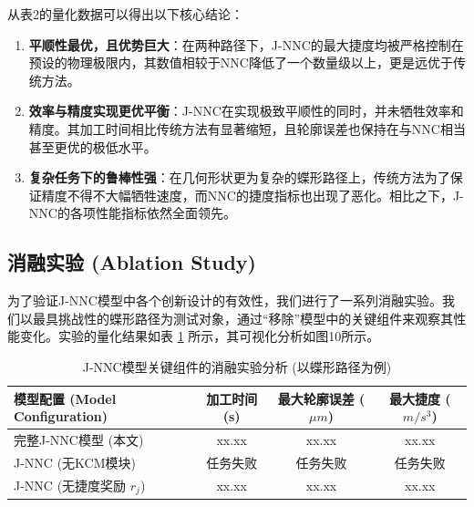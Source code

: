 \documentclass[preprint,12pt]{elsarticle}
\begin{document}
\begin{table}[H]
\centering
\caption{不同方法在两种典型路径下的性能量化对比}
\label{tab:results}
\end{table}

从表2的量化数据可以得出以下核心结论：
\begin{enumerate}
    \item \textbf{平顺性最优，且优势巨大}：在两种路径下，J-NNC的最大捷度均被严格控制在预设的物理极限内，其数值相较于NNC降低了一个数量级以上，更是远优于传统方法。
    \item \textbf{效率与精度实现更优平衡}：J-NNC在实现极致平顺性的同时，并未牺牲效率和精度。其加工时间相比传统方法有显著缩短，且轮廓误差也保持在与NNC相当甚至更优的极低水平。
    \item \textbf{复杂任务下的鲁棒性强}：在几何形状更为复杂的蝶形路径上，传统方法为了保证精度不得不大幅牺牲速度，而NNC的捷度指标也出现了恶化。相比之下，J-NNC的各项性能指标依然全面领先。
\end{enumerate}

\subsection{消融实验 (Ablation Study)}
为了验证J-NNC模型中各个创新设计的有效性，我们进行了一系列消融实验。我们以最具挑战性的蝶形路径为测试对象，通过“移除”模型中的关键组件来观察其性能变化。实验的量化结果如表 \ref{tab:ablation} 所示，其可视化分析如图10所示。

\begin{table}[ht]
\centering
\caption{J-NNC模型关键组件的消融实验分析 (以蝶形路径为例)}
\label{tab:ablation}
\begin{tabular}{lccc}
\toprule
\textbf{模型配置 (Model Configuration)} & \textbf{加工时间 (s)} & \textbf{最大轮廓误差 ($\mu m$)} & \textbf{最大捷度 ($m/s^3$)} \\
\midrule
完整J-NNC模型 (本文) & xx.xx & xx.xx & xx.xx \\
J-NNC (无KCM模块) & 任务失败 & 任务失败 & 任务失败 \\
J-NNC (无捷度奖励 $r_j$) & xx.xx & xx.xx & xx.xx \\
\bottomrule
\end{tabular}
\end{table}
\end{document}
